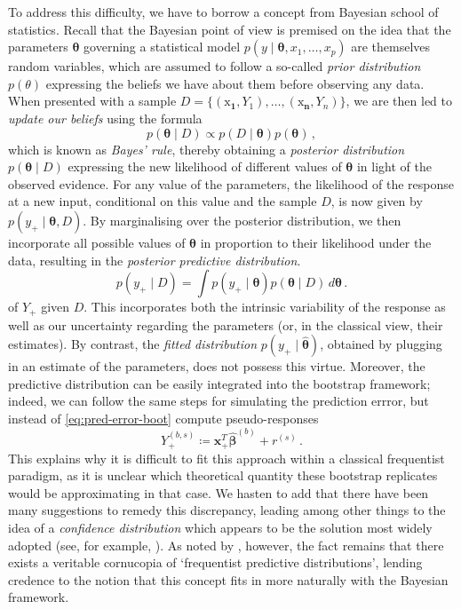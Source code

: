 \documentclass[a4paper]{book}
\begin{document}
To address this difficulty, we have to borrow a concept from Bayesian school of statistics. Recall that the Bayesian point of view is premised on the idea that the parameters $\bm{\theta}$ governing a statistical model $p(y \mid \bm{\theta}, x_1, \dots, x_p)$ are themselves random variables, which are assumed to follow a so-called \emph{prior distribution} $p(\theta)$ expressing the beliefs we have about them before observing any data. When presented with a sample $D = \{ (\bm{\mathrm{x}_1}, Y_1), \dots, (\bm{\mathrm{x}_n}, Y_n) \}$, we are then led to \emph{update our beliefs} using the formula
\begin{equation}
  p(\bm{\theta} \mid D) \propto p(D \mid \bm{\theta}) p(\bm{\theta}) \,,
\end{equation}
which is known as \emph{Bayes' rule}, thereby obtaining a \emph{posterior distribution} $p(\bm{\theta} \mid D)$ expressing the new likelihood of different values of $\bm{\theta}$ in light of the observed evidence. For any value of the parameters, the likelihood of the response at a new input, conditional on this value and the sample $D$, is now given by $p(y_+ \mid \bm{\theta}, D)$. By marginalising over the posterior distribution, we then incorporate all possible values of $\bm{\theta}$ in proportion to their likelihood under the data, resulting in the \emph{posterior predictive distribution}.
\begin{equation}
  p(y_+ \mid D) = \int p(y_+ \mid \bm{\theta}) p(\bm{\theta} \mid D) \, d \bm{\theta} \,.
\end{equation}
of $Y_+$ given $D$. This incorporates both the intrinsic variability of the response as well as our uncertainty regarding the parameters (or, in the classical view, their estimates). By contrast, the \emph{fitted distribution} $p(y_+ \mid \widehat{\bm{\theta}})$, obtained by plugging in an estimate of the parameters, does not possess this virtue. Moreover, the predictive distribution can be easily integrated into the bootstrap framework; indeed, we can follow the same steps for simulating the prediction errror, but instead of \cref{eq:pred-error-boot} compute pseudo-responses
\begin{equation} \label{eq:pred-dist}
  Y_+^{(b, s)} \coloneqq \mathbf{x}_+^T \widehat{\bm{\beta}}^{(b)} + r^{(s)} \,.
\end{equation}
This explains why it is difficult to fit this approach within a classical frequentist paradigm, as it is unclear which theoretical quantity these bootstrap replicates would be approximating in that case. We hasten to add that there have been many suggestions to remedy this discrepancy, leading among other things to the idea of a \emph{confidence distribution} which appears to be the solution most widely adopted (see, for example, \cites{barndorff-nielsen,lawless}). As noted by \textcite{dickson}, however, the fact remains that there exists a veritable cornucopia of `frequentist predictive distributions', lending credence to the notion that this concept fits in more naturally with the Bayesian framework.
\end{document}
